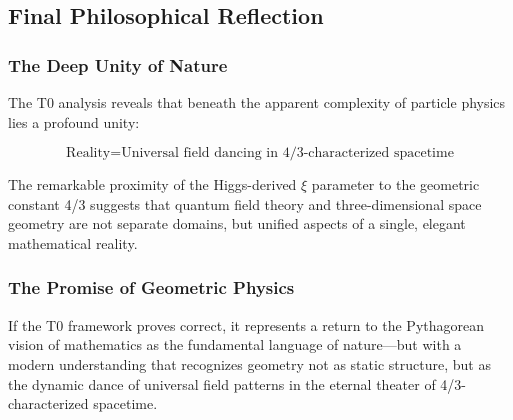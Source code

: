 \documentclass[12pt,a4paper]{article}
\begin{document}
	\subsection{Final Philosophical Reflection}
	\label{subsec:final_reflection}
	
	\subsubsection{The Deep Unity of Nature}
	\label{subsubsec:deep_unity}
	
	The T0 analysis reveals that beneath the apparent complexity of particle physics lies a profound unity:
	
	\begin{equation}
		\boxed{\text{Reality} = \text{Universal field dancing in 4/3-characterized spacetime}}
		\label{eq:ultimate_reality}
	\end{equation}
	
	The remarkable proximity of the Higgs-derived $\xi$ parameter to the geometric constant 4/3 suggests that quantum field theory and three-dimensional space geometry are not separate domains, but unified aspects of a single, elegant mathematical reality.
	
	\subsubsection{The Promise of Geometric Physics}
	\label{subsubsec:geometric_physics_promise}
	
	If the T0 framework proves correct, it represents a return to the Pythagorean vision of mathematics as the fundamental language of nature---but with a modern understanding that recognizes geometry not as static structure, but as the dynamic dance of universal field patterns in the eternal theater of 4/3-characterized spacetime.
	
\end{document}
